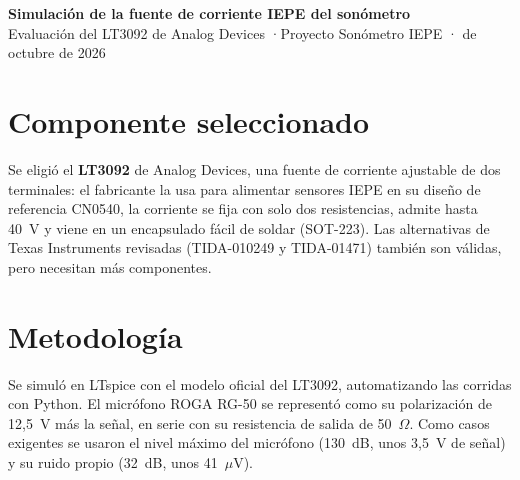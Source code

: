 \documentclass[10pt,a4paper]{article}
\begin{document}
\begin{center}
{\Large\textbf{Simulación de la fuente de corriente IEPE del sonómetro}}\\[3pt]
Evaluación del LT3092 de Analog Devices \quad·\quad Proyecto Sonómetro IEPE \quad· de octubre de 2026
\end{center}

\section{Componente seleccionado}

Se eligió el \textbf{LT3092} de Analog Devices, una fuente de corriente ajustable de dos terminales: el fabricante la usa para alimentar sensores IEPE en su diseño de referencia CN0540, la corriente se fija con solo dos resistencias, admite hasta 40~V y viene en un encapsulado fácil de soldar (SOT-223). Las alternativas de Texas Instruments revisadas (TIDA-010249 y TIDA-01471) también son válidas, pero necesitan más componentes.

\section{Metodología}

Se simuló en LTspice con el modelo oficial del LT3092, automatizando las corridas con Python. El micrófono ROGA RG-50 se representó como su polarización de 12,5~V más la señal, en serie con su resistencia de salida de 50~$\Omega$. Como casos exigentes se usaron el nivel máximo del micrófono (130~dB, unos 3,5~V de señal) y su ruido propio (32~dB, unos 41~$\mu$V).
\end{document}
